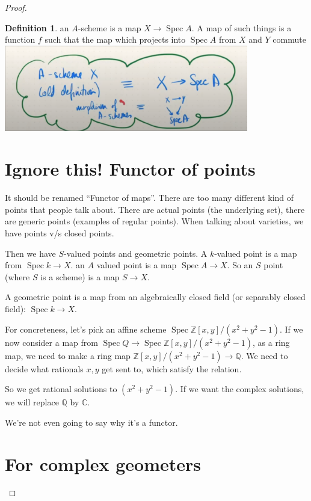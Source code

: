 \documentclass{book}
\newcommand{\Z}{\ensuremath{\mathbb{Z}}}
\newcommand{\Q}{\ensuremath{\mathbb{Q}}}
\newcommand{\C}{\ensuremath{\mathbb{C}}}
\newcommand{\spec}{\operatorname{Spec}}
\theoremstyle{definition}
\newtheorem{definition}[theorem]{Definition}
\begin{document}
\begin{proof}
\begin{definition}
an $A$-scheme is a map $X \rightarrow \spec A$. A map of such things is a 
function $f$ such that the map which projects into $\spec A$ from $X$ and $Y$
commute
\includegraphics[width=0.8\textwidth]{map-of-a-schemes.png}
\end{definition}


\section{Ignore this! Functor of points}

It should be renamed ``Functor of maps''. There are too many different kind
of points that people talk about. There are actual points (the underlying set),
there are generic points (examples of regular points). When talking about
varieties, we have points v/s closed points. 

Then we have $S$-valued points and geometric points. A $k$-valued point is
a map from $\spec k \rightarrow X$. an $A$ valued point is a map $\spec A \rightarrow X$.
So an $S$ point (where $S$ is a scheme) is a map  $S \rightarrow X$.

A geometric point is a map from an algebraically closed field (or separably
closed field): $\spec k \rightarrow X$.


For concreteness, let's pick an affine scheme $ \spec \Z[x, y]/(x^2 + y^2 - 1)$.
If we now consider a map from $\spec Q \rightarrow \spec \Z[x, y]/(x^2 + y^2 - 1)$,
as a ring map, we need to make a ring map $\Z[x, y]/(x^2 + y^2 - 1) \rightarrow \Q$.
We need to decide what rationals $x, y$ get sent to, which satisfy the relation.

So we get rational solutions to $(x^2 + y^2 - 1)$. If we want the complex solutions,
we will replace $\Q$ by $\C$. 

We're not even going to say why it's a functor.


\section{For complex geometers}


\end{proof}
\end{document}
